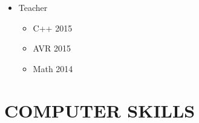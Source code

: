 \documentclass[10pt,a4paper,sans]{moderncv} %
\begin{document}
	\begin{itemize}
		\item Teacher
		\begin{itemize}
			\item C++ \hfill 2015
			\item AVR \hfill 2015
			\item Math \hfill 2014
		\end{itemize}
    \end{itemize}



	\section{COMPUTER SKILLS}
\end{document}
